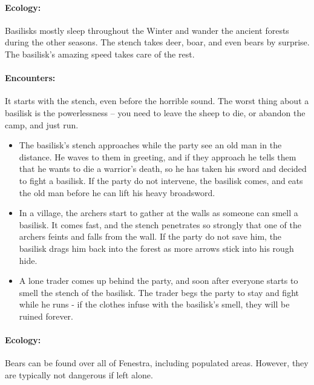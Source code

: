\begin{multicols}{2}
\paragraph{Ecology:} Basilisks mostly sleep throughout the Winter and wander the ancient forests during the other seasons.
The stench takes deer, boar, and even bears by surprise.
The basilisk's amazing speed takes care of the rest.

\paragraph{Encounters:} It starts with the stench, even before the horrible sound.
The worst thing about a basilisk is the powerlessness -- you need to leave the sheep to die, or abandon the camp, and just run.

\begin{itemize}

  \item{The basilisk's stench approaches while the party see an old man in the distance.
  He waves to them in greeting, and if they approach he tells them that he wants to die a warrior's death, so he has taken his sword and decided to fight a basilisk.
  If the party do not intervene, the basilisk comes, and eats the old man before he can lift his heavy broadsword.}
  \item
  In a village, the archers start to gather at the walls as someone can smell a basilisk.
  It comes fast, and the stench penetrates so strongly that one of the archers feints and falls from the wall.
  If the party do not save him, the basilisk drags him back into the forest as more arrows stick into his rough hide.
  \item
  A lone trader comes up behind the party, and soon after everyone starts to smell the stench of the basilisk.
  The trader begs the party to stay and fight while he runs - if the clothes infuse with the basilisk's smell, they will be ruined forever.
  

\end{itemize}

\label{bear}

\paragraph{Ecology:} Bears can be found over all of Fenestra, including populated areas.  However, they are typically not dangerous if left alone.

\bear


\end{multicols}

